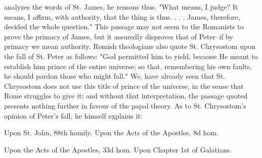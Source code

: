 analyzes the words of St. James, he reasons thus. "What means, I judge? It means, I affirm, with authority, that the thing is thus. . . . James, therefore, decided the whole question." This passage may not seem to the Romanists to prove the primacy of James, but it assuredly disproves that of Peter--if by primacy we mean authority. Romish theologians also quote St. Chrysostom upon the fall of St. Peter as follows: "God permitted him to yield, because He meant to establish him prince of the entire universe; so that, remembering his own faults, he should pardon those who might fall." We, have already seen that St. Chrysostom does not use this title of prince of the universe, in the sense that Rome struggles to give it; and without that interpretation, the passage quoted presents nothing further in favour of the papal theory. As to St. Chrysostom's opinion of Peter's fall, he himself explains it:

Upon St. John, 88th homily. Upon the Acts of the Apostles, 8d hom.

Upon the Acts of the Apostles, 33d hom. Upon Chapter 1st of Galatians.

